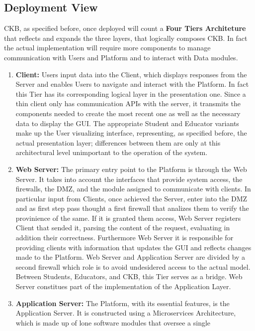 \subsection{Deployment View}
CKB, as specified before, once deployed will count a \textbf{Four Tiers Architeture} that reflects and expands the three layers, that logically composes CKB.
In fact the actual implementation will require more components to manage communication with Users and Platform and to interact with Data modules.
\begin{enumerate}[label=$\bullet$]
    \item \textbf{Client:} Users input data into the Client, which displays responses from the Server and enables Users to navigate and interact with the Platform. In fact this Tier has its corresponding logical layer in the presentation one. 
    Since a thin client only has communication APIs with the server, it transmits the components needed to create the most recent one as well as the necessary data to display the GUI.
    The appropriate Student and Educator variants make up the User visualizing interface, representing, as specified before, the actual presentation layer; differences between them 
    are only at this architectural level unimportant to the operation of the system.
    \item \textbf{Web Server:} The primary entry point to the Platform is through the Web Server. It takes into account the interfaces that provide system access, the firewalls, the DMZ, and the module assigned to communicate with 
    clients. In particular input from Clients, once achieved the Server, enter into the DMZ and as first step pass thought a first firewall that analizes them to verify the provinience of the same. If it is granted them access, Web Server registers Client that sended it, parsing the content of the request, evaluating in addition their correctness. 
    Furthermore Web Server it is responsible for providing clients with information that updates the GUI and reflects changes made to the Platform. Web Server and Application Server are divided by a second firewall which role is to avoid undesidered access to the actual model. Between Students, Educators, 
    and CKB, this Tier serves as a bridge. Web Server constitues part of the implementation of the Application Layer.
    \item \textbf{Application Server:} The Platform, with its essential features, is the Application Server. It is constructed using a Microservices Architecture, which is made up of lone software modules that oversee a single 

\end{enumerate}

